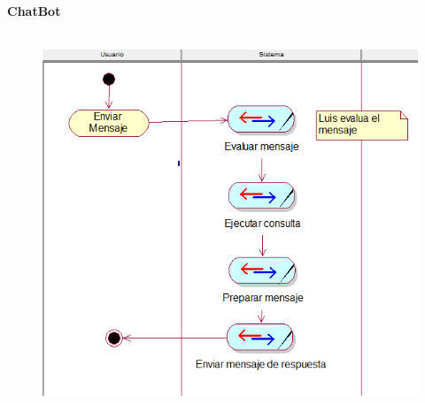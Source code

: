 \documentclass[12pt]{report}
\begin{document}

\par




\newpage

\vspace{\baselineskip}\textbf{ChatBot}\par




\begin{figure}[H]
	\begin{Center}
		\includegraphics[width=4.84in,height=4.48in]{./media/image6.png}
	\end{Center}
\end{figure}



\par
\end{document}
